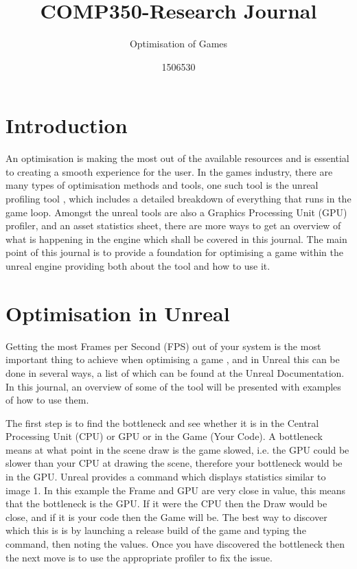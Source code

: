 \documentclass{scrartcl}
\title{COMP350-Research Journal}
\subtitle{Optimisation of Games}
\author{1506530}
\begin{document}
	
	
    \maketitle
\section{Introduction}
An optimisation is making the most out of the available resources and is essential to creating a smooth experience for the user. In the games industry, there are many types of optimisation methods and tools, one such tool is the unreal profiling tool \cite{UEPer}, which includes a detailed breakdown of everything that runs in the game loop. Amongst the unreal tools are also a Graphics Processing Unit (GPU) profiler, and an asset statistics sheet, there are more ways to get an overview of what is happening in the engine which shall be covered in this journal. The main point of this journal is to provide a foundation for optimising a game within the unreal engine providing both about the tool and how to use it.

\section{Optimisation in Unreal}
Getting the most Frames per Second (FPS) out of your system is the most important thing to achieve when optimising a game \cite{UEYouTube}, and in Unreal this can be done in several ways, a list of which can be found at the Unreal Documentation. In this journal, an overview of some of the tool will be presented with examples of how to use them.

The first step is to find the bottleneck and see whether it is in the Central Processing Unit (CPU) or GPU or in the Game (Your Code). A bottleneck means at what point in the scene draw is the game slowed, i.e. the GPU could be slower than your CPU at drawing the scene, therefore your bottleneck would be in the GPU. Unreal provides a command  which displays statistics similar to image 1. In this example the Frame and GPU are very close in value, this means that the bottleneck is the GPU. If it were the CPU then the Draw would be close, and if it is your code then the Game will be. The best way to discover which this is is by launching a release build of the game and typing the command, then noting the values. Once you have discovered the bottleneck then the next move is to use the appropriate profiler to fix the issue.
\end{document}
